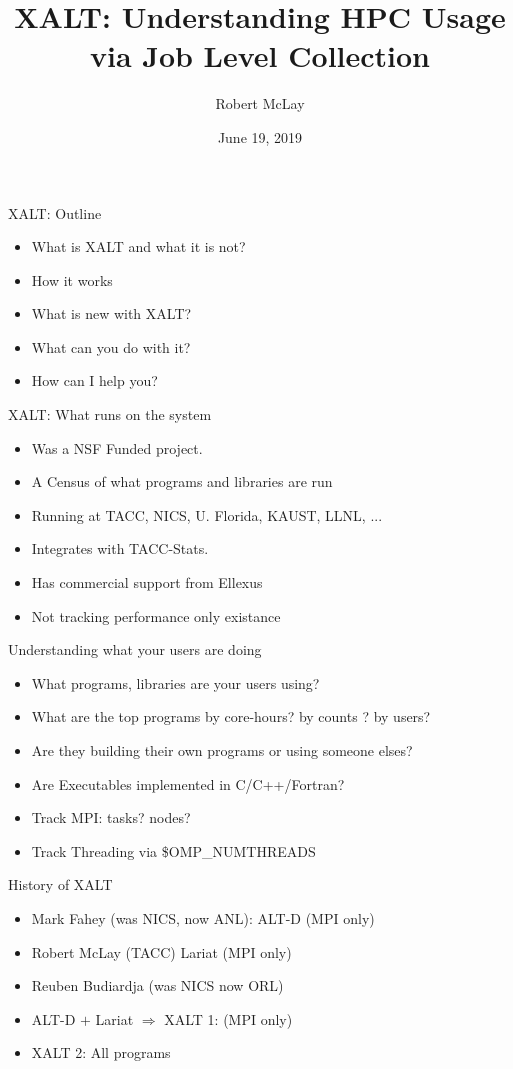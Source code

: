 \documentclass{beamer}
\begin{document}
\title[XALT]{XALT: Understanding HPC Usage via Job Level Collection}
\author{Robert McLay} 
\date{June 19, 2019} 

\frame{\titlepage} 

\begin{frame}{XALT: Outline}
  \begin{itemize}
    \item What is XALT and what it is not?
    \item How it works
    \item What is new with XALT?
    \item What can you do with it?
    \item How can I help you?
  \end{itemize}
\end{frame}

\begin{frame}{XALT: What runs on the system}
  \begin{itemize}
    \item Was a NSF Funded project.
    \item A Census of what programs and libraries are run
    \item Running at TACC, NICS, U. Florida, KAUST, LLNL, ...
    \item Integrates with TACC-Stats.
    \item Has commercial support from Ellexus 
    \item Not tracking performance only existance 
  \end{itemize}
\end{frame}

\begin{frame}{Understanding what your users are doing}
  \begin{itemize}
    \item What programs, libraries are your users using?
    \item What are the top programs by core-hours? by counts ? by users?
    \item Are they building their own programs or using someone elses?
    \item Are Executables implemented in C/C++/Fortran?
    \item Track MPI: tasks? nodes?
    \item Track Threading via \$OMP\_NUMTHREADS
  \end{itemize}
\end{frame}

\begin{frame}{History of XALT}
  \begin{itemize}
    \item Mark Fahey (was NICS, now ANL): ALT-D (MPI only)
    \item Robert McLay (TACC) Lariat (MPI only)
    \item Reuben Budiardja (was NICS now ORL)
    \item ALT-D $+$ Lariat $\Rightarrow$ XALT 1: (MPI only)
    \item XALT 2: All programs
  \end{itemize}
\end{frame}
\end{document}
